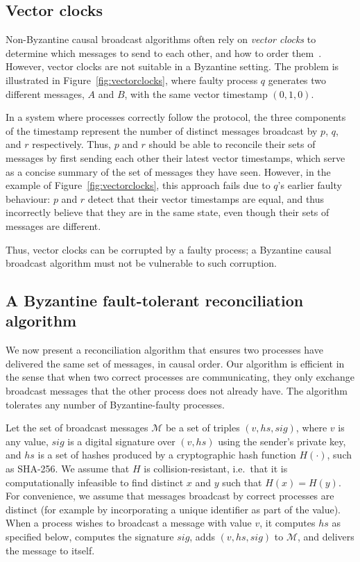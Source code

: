 \documentclass[a4paper,anonymous,USenglish]{lipics-v2019}
\begin{document}
\subsection{Vector clocks}

Non-Byzantine causal broadcast algorithms often rely on \emph{vector clocks} to determine which messages to send to each other, and how to order them~\cite{Birman:1991el,Schwarz:1994}.
However, vector clocks are not suitable in a Byzantine setting.
The problem is illustrated in Figure~\ref{fig:vectorclocks}, where faulty process $q$ generates two different messages, $A$ and $B$, with the same vector timestamp $(0, 1, 0)$.

In a system where processes correctly follow the protocol, the three components of the timestamp represent the number of distinct messages broadcast by $p$, $q$, and $r$ respectively.
Thus, $p$ and $r$ should be able to reconcile their sets of messages by first sending each other their latest vector timestamps, which serve as a concise summary of the set of messages they have seen.
However, in the example of Figure~\ref{fig:vectorclocks}, this approach fails due to $q$'s earlier faulty behaviour: $p$ and $r$ detect that their vector timestamps are equal, and thus incorrectly believe that they are in the same state, even though their sets of messages are different.

Thus, vector clocks can be corrupted by a faulty process; a Byzantine causal broadcast algorithm must not be vulnerable to such corruption.

\subsection{A Byzantine fault-tolerant reconciliation algorithm}\label{sec:algorithm1}

We now present a reconciliation algorithm that ensures two processes have delivered the same set of messages, in causal order.
Our algorithm is efficient in the sense that when two correct processes are communicating, they only exchange broadcast messages that the other process does not already have.
The algorithm tolerates any number of Byzantine-faulty processes.

Let the set of broadcast messages $\mathcal{M}$ be a set of triples $(v, \mathit{hs}, \mathit{sig})$, where $v$ is any value, $\mathit{sig}$ is a digital signature over $(v, \mathit{hs})$ using the sender's private key, and $\mathit{hs}$ is a set of hashes produced by a cryptographic hash function $H(\cdot)$, such as SHA-256.
We assume that $H$ is collision-resistant, i.e.\ that it is computationally infeasible to find distinct $x$ and $y$ such that $H(x) = H(y)$.
For convenience, we assume that messages broadcast by correct processes are distinct (for example by incorporating a unique identifier as part of the value).
When a process wishes to broadcast a message with value $v$, it computes $\mathit{hs}$ as specified below, computes the signature $\mathit{sig}$, adds $(v, \mathit{hs}, \mathit{sig})$ to $\mathcal{M}$, and delivers the message to itself.
\end{document}
